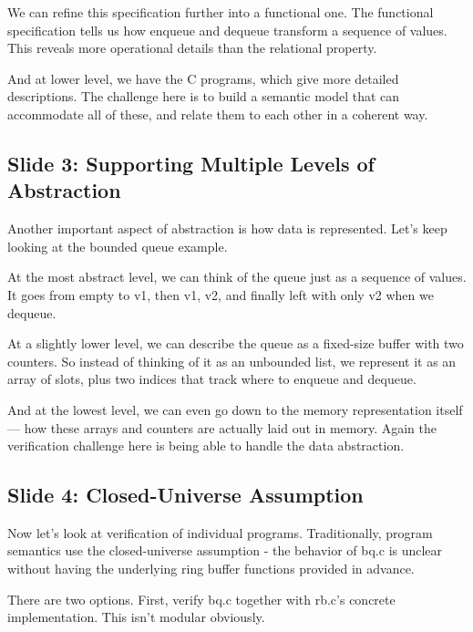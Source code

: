 \documentclass{article}
\begin{document}
We can refine this specification further into a functional one. The functional
specification tells us how enqueue and dequeue transform a sequence of values.
This reveals more operational details than the relational property.

And at lower level, we have the C programs, which give more detailed
descriptions. The challenge here is to build a semantic model that can
accommodate all of these, and relate them to each other in a coherent way.

\subsection{Slide 3: Supporting Multiple Levels of Abstraction}

Another important aspect of abstraction is how data is represented. Let's keep
looking at the bounded queue example.

At the most abstract level, we can think of the queue just as a sequence of
values. It goes from empty to v1, then v1, v2, and finally left with only v2
when we dequeue.

At a slightly lower level, we can describe the queue as a fixed-size buffer with
two counters. So instead of thinking of it as an unbounded list, we represent it
as an array of slots, plus two indices that track where to enqueue and dequeue.

And at the lowest level, we can even go down to the memory representation itself
— how these arrays and counters are actually laid out in memory. Again the
verification challenge here is being able to handle the data abstraction.

\subsection{Slide 4: Closed-Universe Assumption}

Now let's look at verification of individual programs. Traditionally, program
semantics use the closed-universe assumption - the behavior of bq.c is unclear
without having the underlying ring buffer functions provided in advance.

There are two options. First, verify bq.c together with
rb.c's concrete implementation. This isn't modular obviously.
\end{document}
